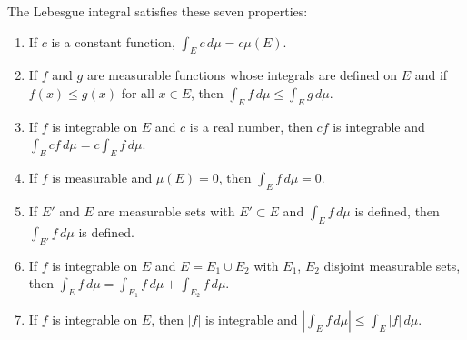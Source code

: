 The Lebesgue integral satisfies these seven properties:
\begin{enumerate}
\item[(1)] If $c$ is a constant function, $\int_E c \, d\mu = c \mu(E)$.
\item[(2)] If $f$ and $g$ are measurable functions whose integrals are defined on $E$ and if $f(x) \leq g(x)$ for all $x \in E$, then $\int_E f \, d\mu \leq \int_E g \, d\mu$.
\item[(3)] If $f$ is integrable on $E$ and $c$ is a real number, then $cf$ is integrable and $\int_E cf \, d\mu = c \int_E f \, d\mu$.
\item[(4)] If $f$ is measurable and $\mu(E) = 0$, then $\int_E f \, d\mu = 0$.
\item[(5)] If $E'$ and $E$ are measurable sets with $E' \subset E$ and $\int_E f \, d\mu$ is defined, then $\int_{E'} f \, d\mu$ is defined.
\item[(6)] If $f$ is integrable on $E$ and $E = E_1 \cup E_2$ with $E_1$, $E_2$ disjoint measurable sets, then $\int_E f \, d\mu = \int_{E_1} f \, d\mu + \int_{E_2} f \, d\mu$.
\item[(7)] If $f$ is integrable on $E$, then $|f|$ is integrable and $|\int_E f \, d\mu| \leq \int_E |f| \, d\mu$.
\end{enumerate}
